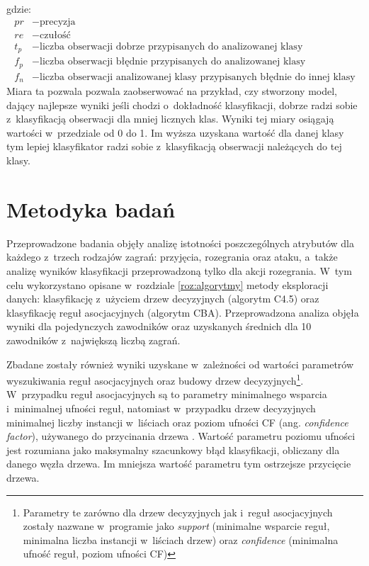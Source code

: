 \documentclass[a4paper,twoside,12pt]{book}
\newcommand{\obcy}[1]{\emph{#1}}
\renewcommand{\ang}[1]{{\selectlanguage{british}\obcy{#1}}}
\begin{document}
gdzie:
\begin{align*}
	pr	&- \text{precyzja}\\
	re	&- \text{czułość}\\
	t_p &- \text{liczba obserwacji dobrze przypisanych do analizowanej klasy}\\
    f_p &- \text{liczba obserwacji błędnie przypisanych do analizowanej klasy}\\
    f_n &- \text{liczba obserwacji analizowanej klasy przypisanych błędnie do innej klasy}
\end{align*} 
Miara ta pozwala pozwala zaobserwować na przykład, czy stworzony model, dający najlepsze wyniki jeśli chodzi o~dokładność klasyfikacji, dobrze radzi sobie z~klasyfikacją obserwacji dla mniej licznych klas. Wyniki tej miary osiągają wartości w~przedziale od 0 do 1. Im wyższa uzyskana wartość dla danej klasy tym lepiej klasyfikator radzi sobie z~klasyfikacją obserwacji należących do tej klasy.


\section{Metodyka badań}
\label{roz:metodyka}

Przeprowadzone badania objęły analizę istotności poszczególnych atrybutów dla każdego z~trzech rodzajów zagrań: przyjęcia, rozegrania oraz ataku, a~także analizę wyników klasyfikacji przeprowadzoną tylko dla akcji rozegrania. W~tym celu wykorzystano opisane w~rozdziale \ref{roz:algorytmy} metody eksploracji danych: klasyfikację z~użyciem drzew decyzyjnych (algorytm C4.5) oraz klasyfikację reguł asocjacyjnych (algorytm CBA). Przeprowadzona analiza objęła wyniki dla pojedynczych zawodników oraz uzyskanych średnich dla 10 zawodników z~największą liczbą zagrań.

Zbadane zostały również wyniki uzyskane w~zależności od wartości parametrów wyszukiwania reguł asocjacyjnych oraz budowy drzew decyzyjnych\footnote{\label{parametry} Parametry te zarówno dla drzew decyzyjnych jak i~reguł asocjacyjnych zostały nazwane w~programie jako \ang{support} (minimalne wsparcie reguł, minimalna liczba instancji w~liściach drzew) oraz \ang{confidence} (minimalna ufność reguł, poziom ufności CF)}. W~przypadku reguł asocjacyjnych są to parametry minimalnego wsparcia i~minimalnej ufności reguł, natomiast w~przypadku drzew decyzyjnych minimalnej liczby instancji w~liściach oraz poziom ufności CF (ang. \ang{confidence factor}), używanego do przycinania drzewa \cite{bib:confidenceFactor}. Wartość parametru poziomu ufności jest rozumiana jako maksymalny szacunkowy błąd klasyfikacji, obliczany dla danego węzła drzewa. Im mniejsza wartość parametru tym ostrzejsze przycięcie drzewa.
\end{document}
